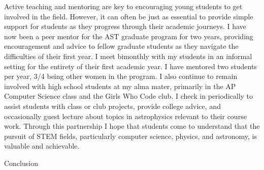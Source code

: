 \documentclass{article}
\begin{document}
Active teaching and mentoring are key to encouraging young students to get involved in the field. However, it can often be just as essential to provide simple support for students as they progress through their academic journeys. I have now been a peer mentor for the AST graduate program for two years, providing encouragement and advice to fellow graduate students as they navigate the difficulties of their first year. I meet bimonthly with my students in an informal setting for the entirety of their first academic year. I have mentored two students per year, 3/4 being other women in the program. I also continue to remain involved with high school students at my alma mater, primarily in the AP Computer Science class and the Girls Who Code club. I check in periodically to assist students with class or club projects, provide college advice, and occasionally guest lecture about topics in astrophysics relevant to their course work. Through this partnership I hope that students come to understand that the pursuit of STEM fields, particularly computer science, physics, and astronomy, is valuable and achievable.

Conclusion
\end{document}

